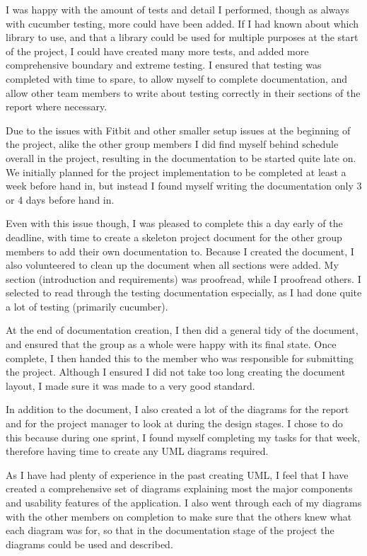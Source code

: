  I was happy with the amount of tests and detail I performed, though as always with cucumber testing, more could have been added. If I had known about which library to use, and that a library could be used for multiple purposes at the start of the project, I could have created many more tests, and added more comprehensive boundary and extreme testing. I ensured that testing was completed with time to spare, to allow myself to complete documentation, and allow other team members to write about testing correctly in their sections of the report where necessary. \par
Due to the issues with Fitbit and other smaller setup issues at the beginning of the project, alike the other group members I did find myself behind schedule overall in the project, resulting in the documentation to be started quite late on. We initially planned for the project implementation to be completed at least a week before hand in, but instead I found myself writing the documentation only 3 or 4 days before hand in. \par
Even with this issue though, I was pleased to complete this a day early of the deadline, with time to create a skeleton project document for the other group members to add their own documentation to. Because I created the document, I also volunteered to clean up the document when all sections were added. My section (introduction and requirements) was proofread, while I proofread others. I selected to read through the testing documentation especially, as I had done quite a lot of testing (primarily cucumber). \par
At the end of documentation creation, I then did a general tidy of the document, and ensured that the group as a whole were happy with its final state. Once complete, I then handed this to the member who was responsible for submitting the project. Although I ensured I did not take too long creating the document layout, I made sure it was made to a very good standard. \par
In addition to the document, I also created a lot of the diagrams for the report and for the project manager to look at during the design stages. I chose to do this because during one sprint, I found myself completing my tasks for that week, therefore having time to create any UML diagrams required. \par
As I have had plenty of experience in the past creating UML, I feel that I have created a comprehensive set of diagrams explaining most the major components and usability features of the application. I also went through each of my diagrams with the other members on completion to make sure that the others knew what each diagram was for, so that in the documentation stage of the project the diagrams could be used and described. \par
